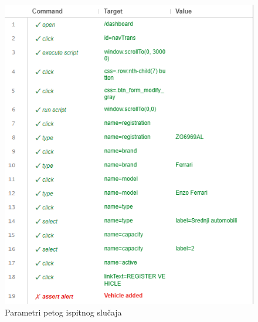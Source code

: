 			\begin{figure}[H]
				\centering
				\includegraphics[width=\textwidth]{"slike/Selenium/transport testovi/addVehicleAgain_parametri.png"}
				\caption{Parametri petog ispitnog slučaja}
				\label{fig: addVehicleAgain_parametri}
			\end{figure}
